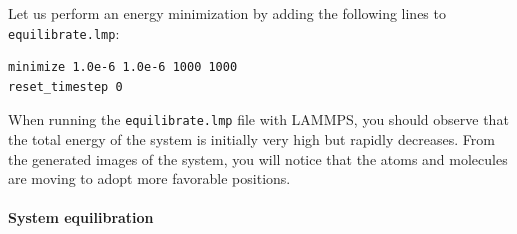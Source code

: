 \documentclass[9pt,tutorial]{livecoms}
\newcommand{\lmpcmd}[1]{\colorbox{listing}{\textcolor{command}{\small{#1}}}} %
\newcommand{\flecmd}[1]{\textcolor{command}{\texttt{#1}}} %
\begin{document}
Let us perform an energy minimization by adding the following lines to \flecmd{equilibrate.lmp}:
\begin{lstlisting}
minimize 1.0e-6 1.0e-6 1000 1000
reset_timestep 0
\end{lstlisting}
When running the \flecmd{equilibrate.lmp} file with LAMMPS, you should observe that the
total energy of the system is initially very high but rapidly decreases.  From the generated
images of the system, you will notice that the atoms and molecules are moving to adopt more favorable positions.








\paragraph{System equilibration}
\end{document}

